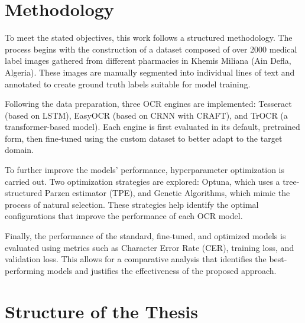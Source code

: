 \section*{Methodology}

To meet the stated objectives, this work follows a structured methodology. The process begins with the construction of a dataset composed of over 2000 medical label images gathered from different pharmacies in Khemis Miliana (Ain Defla, Algeria). These images are manually segmented into individual lines of text and annotated to create ground truth labels suitable for model training.

Following the data preparation, three OCR engines are implemented: Tesseract (based on LSTM), EasyOCR (based on CRNN with CRAFT), and TrOCR (a transformer-based model). Each engine is first evaluated in its default, pretrained form, then fine-tuned using the custom dataset to better adapt to the target domain.

To further improve the models’ performance, hyperparameter optimization is carried out. Two optimization strategies are explored: Optuna, which uses a tree-structured Parzen estimator (TPE), and Genetic Algorithms, which mimic the process of natural selection. These strategies help identify the optimal configurations that improve the performance of each OCR model.

Finally, the performance of the standard, fine-tuned, and optimized models is evaluated using metrics such as Character Error Rate (CER), training loss, and validation loss. This allows for a comparative analysis that identifies the best-performing models and justifies the effectiveness of the proposed approach.

\section*{Structure of the Thesis}

